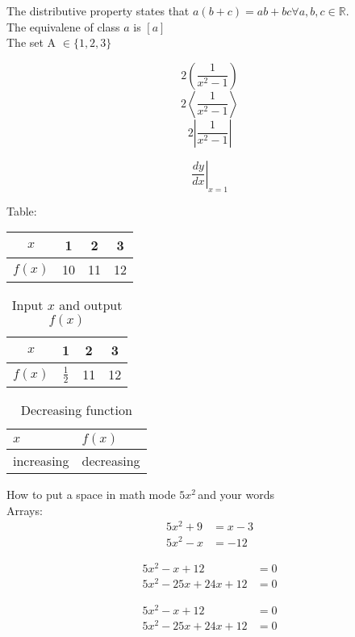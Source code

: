 \documentclass[11pt]{article}
\begin{document}
The distributive property states that $a(b+c) = ab + bc \forall a,b,c \in \mathbb{R}$.\\[6pt]
The equivalene of class $a$ is $[a]$\\[6pt]
The set A $\in \{1,2,3\}$

$$2\left(\frac{1}{x^2-1}\right)$$
$$2\left\langle\frac{1}{x^2-1} \right\rangle$$
$$2\left|\frac{1}{x^2-1}\right|$$

$$\left.\frac{dy}{dx} \right|_{x=1}$$


Table:\\

\begin{tabular}{|c|c|c|c|}
\hline
$x$ & 1 & 2 & 3\\
\hline
$f(x)$ & 10 & 11 & 12\\
\hline
\end{tabular}

\vspace{6pt}

\begin{table}[H]
\centering
\def\arraystretch{2}


\begin{tabular}{|c|c|c|c|}
\hline
$x$ & 1 & 2 & 3\\
\hline
$f(x)$ & $\frac{1}{2}$ & 11 & 12\\
\hline
\end{tabular}
\caption{Input $x$ and output $f(x)$}
\end{table}

\begin{table}[H]
\centering

\begin{tabular}{|p{3in}|p{3in}|}
\hline
$x$ & $f(x)$\\
\hline
increasing & decreasing\\
\hline
\end{tabular}
\caption{Decreasing function}
\end{table}


How to put a space in math mode $5x^2\,$and your words\\[6pt]

Arrays:
\begin{align}
5x^2+9 &= x-3\\
5x^2-x &= -12
\end{align}

\begin{align*}
5x^2-x+12 &=0\\
5x^2-25x+24x+12 &=0
\end{align*}

\begin{align}
5x^2-x+12 &=0\\
5x^2-25x+24x+12 &=0
\end{align}
\end{document}
